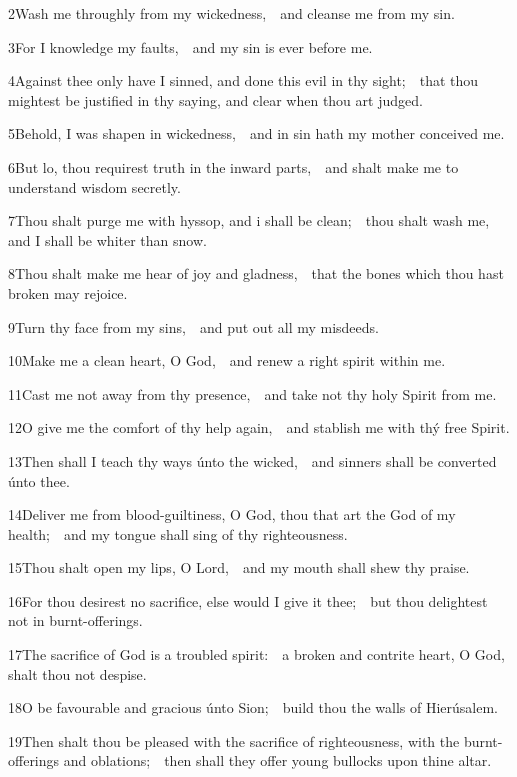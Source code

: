 2\enspace Wash me throughly from my wickedness,\ \star\ and cleanse me from my sin.

3\enspace For I knowledge my faults,\ \star\ and my sin is ever before me.

4\enspace Against thee only have I sinned, and done this evil in thy sight;\ \star\ that thou mightest be justified in thy saying, and clear when thou art judged.

5\enspace Behold, I was shapen in wickedness,\ \star\ and in sin hath my mother conceived me.

6\enspace But lo, thou requirest truth in the inward parts,\ \star\ and shalt make me to understand wisdom secretly.

7\enspace Thou shalt purge me with hyssop, and i shall be clean;\ \star\ thou shalt wash me, and I shall be whiter than snow.

8\enspace Thou shalt make me hear of joy and gladness,\ \star\ that the bones which thou hast broken may rejoice.

9\enspace Turn thy face from my sins,\ \star\ and put out all my misdeeds.

10\enspace Make me a clean heart, O God,\ \star\ and renew a right spirit within me.

11\enspace Cast me not away from thy presence,\ \star\ and take not thy holy Spirit from me.

12\enspace O give me the comfort of thy help again,\ \star\ and stablish me with thý free Spirit.

13\enspace Then shall I teach thy ways únto the wicked,\ \star\ and sinners shall be converted únto thee.

14\enspace Deliver me from blood-guiltiness, O God, thou that art the God of my health;\ \star\ and my tongue shall sing of thy righteousness.

15\enspace Thou shalt open my lips, O Lord,\ \star\ and my mouth shall shew thy praise.

16\enspace For thou desirest no sacrifice, else would I give it thee;\ \star\ but thou delightest not in burnt-offerings.

17\enspace The sacrifice of God is a troubled spirit:\ \star\ a broken and contrite heart, O God, shalt thou not despise.

18\enspace O be favourable and gracious únto Sion;\ \star\ build thou the walls of Hierúsalem.

19\enspace Then shalt thou be pleased with the sacrifice of righteousness, with the burnt-offerings and oblations;\ \star\ then shall they offer young bullocks upon thine altar.

